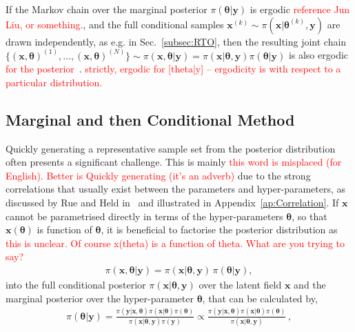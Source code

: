 If the Markov chain over the marginal posterior $\pi(\bm{\theta} |  \bm{y})$ is ergodic \textcolor{red}{reference Jun Liu, or something.}, and the full conditional samples $\bm{x}^{(k)} \sim \pi(\bm{x}|   \bm{\theta}^{(k)}, \bm{y})$ are drawn independently, as e.g. in Sec.~\ref{subsec:RTO}, then the resulting joint chain $\{ (\bm{x}, \bm{\theta})^{(1)}, \dots, (\bm{x}, \bm{\theta})^{(N)} \} \sim \pi(\bm{x}, \bm{\theta} |  \bm{y}) =  \pi(\bm{x} |  \bm{\theta} , \bm{y}) \pi( \bm{\theta} | \bm{y})$ is also ergodic \textcolor{red}{for the posterior}~\cite{acosta2022markov}. \textcolor{red}{strictly, ergodic for [theta|y] -- ergodicity is with respect to a particular distribution.}





\subsection{Marginal and then Conditional Method}
\label{subsec:TheoMTC}
Quickly generating a representative sample set from the posterior distribution often presents a significant challenge. This is mainly \textcolor{red}{this word is misplaced (for English). Better is Quickly generating (it's an adverb)} due to the strong correlations that usually exist between the parameters and hyper-parameters, as discussed by Rue and Held in~\cite{rue2005gaussian} and illustrated in Appendix~\ref{ap:Correlation}.
If $\bm{x}$ cannot be parametrised directly in terms of the hyper-parameters $\bm{\theta}$, so that $\bm{x}(\bm{\theta})$ is function of $\bm{\theta}$, it is beneficial to factorise the posterior distribution as \textcolor{red}{this is unclear. Of course x(theta) is a function of theta. What are you trying to say?}
\begin{align}
	\pi(\bm{x}, \bm{\theta} |  \bm{y}) = \pi(\bm{x} |  \bm{\theta}, \bm{y}) \, \pi(\bm{\theta} |   \bm{y}), \label{eq:MTC}
\end{align}
into the full conditional posterior $\pi(\bm{x} |  \bm{\theta}, \bm{y})$ over the latent field $\bm{x}$ and the marginal posterior over the hyper-parameter $\bm{\theta}$, that can be calculated by,
\begin{align}
	\pi(\bm{\theta} |   \bm{y}) =  \frac{ \pi(   \bm{y} | \bm{x},\bm{\theta})  \pi( \bm{x} | \bm{\theta} )  \pi(\bm{\theta}) }{ \pi(\bm{x} | \bm{\theta} ,   \bm{y})   \pi( \bm{y})} \propto \frac{ \pi(   \bm{y} | \bm{x},\bm{\theta})  \pi( \bm{x} | \bm{\theta} )  \pi(\bm{\theta}) }{ \pi(\bm{x} | \bm{\theta} ,   \bm{y}) } \label{eq:margGen}\, ,
\end{align}

